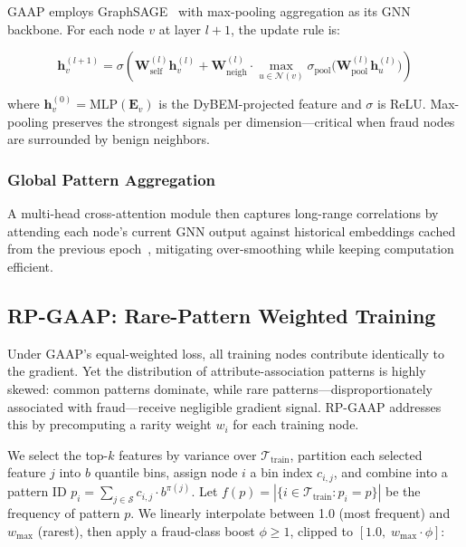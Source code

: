 GAAP employs GraphSAGE~\cite{hamilton2017inductive} with max-pooling aggregation as its GNN backbone. For each node $v$ at layer $l+1$, the update rule is:

\begin{equation}
\mathbf{h}_v^{(l+1)} = \sigma\!\left(\mathbf{W}_{\text{self}}^{(l)} \mathbf{h}_v^{(l)} + \mathbf{W}_{\text{neigh}}^{(l)} \cdot \max_{u \in \mathcal{N}(v)} \sigma_{\text{pool}}\!\big(\mathbf{W}_{\text{pool}}^{(l)} \mathbf{h}_u^{(l)}\big)\right)
\label{eq:sage}
\end{equation}

where $\mathbf{h}_v^{(0)} = \text{MLP}(\mathbf{E}_v)$ is the DyBEM-projected feature and $\sigma$ is ReLU. Max-pooling preserves the strongest signals per dimension---critical when fraud nodes are surrounded by benign neighbors.

\subsubsection{Global Pattern Aggregation}

A multi-head cross-attention module then captures long-range correlations by attending each node's current GNN output against historical embeddings cached from the previous epoch~\cite{duan2025gaap}, mitigating over-smoothing while keeping computation efficient.

\subsection{RP-GAAP: Rare-Pattern Weighted Training}

Under GAAP's equal-weighted loss, all training nodes contribute identically to the gradient. Yet the distribution of attribute-association patterns is highly skewed: common patterns dominate, while rare patterns---disproportionately associated with fraud---receive negligible gradient signal. RP-GAAP addresses this by precomputing a rarity weight $w_i$ for each training node.

We select the top-$k$ features by variance over $\mathcal{T}_{\text{train}}$, partition each selected feature $j$ into $b$ quantile bins, assign node $i$ a bin index $c_{i,j}$, and combine into a pattern ID $p_i = \sum_{j \in \mathcal{S}} c_{i,j} \cdot b^{\pi(j)}$. Let $f(p) = |\{i \in \mathcal{T}_{\text{train}} : p_i = p\}|$ be the frequency of pattern $p$. We linearly interpolate between 1.0 (most frequent) and $w_{\text{max}}$ (rarest), then apply a fraud-class boost $\phi \geq 1$, clipped to $[1.0,\; w_{\text{max}} \cdot \phi]$:


